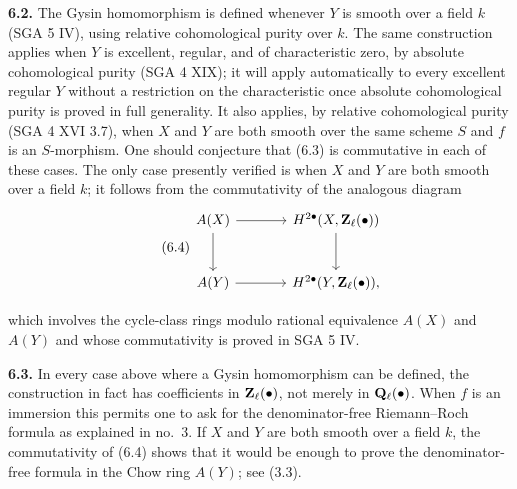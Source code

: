 \textbf{6.2.} The Gysin homomorphism is defined whenever $Y$ is smooth over
a field $k$ (SGA 5 IV), using relative cohomological purity over $k$. The
same construction applies when $Y$ is excellent, regular, and of
characteristic zero, by absolute cohomological purity (SGA 4 XIX); it will
apply automatically to every excellent regular $Y$ without a restriction
on the characteristic once absolute cohomological purity is proved in full
generality. It also applies, by relative cohomological purity (SGA 4 XVI
3.7), when $X$ and $Y$ are both smooth over the same scheme $S$ and $f$ is
an $S$-morphism. One should conjecture that (6.3) is commutative in each of
these cases. The only case presently verified is when $X$ and $Y$ are both
smooth over a field $k$; it follows from the commutativity of the analogous
diagram
\begin{equation}\tag{6.4}
\begin{tikzcd}[column sep=large,row sep=large]
 A(X) \arrow[r] \arrow[d]
   & H^{2\bullet}(X,\Zell(\bullet)) \arrow[d] \\
 A(Y) \arrow[r]
   & H^{2\bullet}(Y,\Zell(\bullet)),
\end{tikzcd}
\end{equation}

which involves the cycle-class rings modulo rational equivalence $A(X)$ and
$A(Y)$ and whose commutativity is proved in SGA 5 IV.

\textbf{6.3.} In every case above where a Gysin homomorphism can be defined,
the construction in fact has coefficients in $\mathbf Z_\ell(\bullet)$, not merely
in $\mathbf Q_\ell(\bullet)$. When $f$ is an immersion this permits one to ask for
the denominator-free Riemann--Roch formula as explained in no.~3. If $X$
and $Y$ are both smooth over a field $k$, the commutativity of (6.4) shows
that it would be enough to prove the denominator-free formula in the Chow
ring $A(Y)$; see (3.3).

